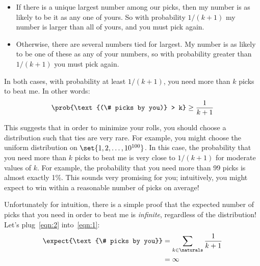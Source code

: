 \begin{editingnotes}
\begin{itemize}
\item If there is a unique largest number among our picks, then my
number is as likely to be it as any one of yours.  So with probability
$1/(k+1)$ my number is larger than all of yours, and you must pick
again.

\item Otherwise, there are several numbers tied for largest.  My
number is as likely to be one of these as any of your numbers, so with
probability greater than $1/(k+1)$ you must pick again.

\end{itemize}
%
In both cases, with probability at least $1/(k+1)$, you need more than
$k$ picks to beat me.  In other words:
%
\begin{align}
\prob{\text{(\# picks by you)} > k} \geq \frac{1}{k+1} \label{eqn:2}
\end{align}

This suggests that in order to minimize your rolls, you should choose a
distribution such that ties are very rare.  For example, you might
choose the uniform distribution on $\set{1, 2, \dots, 10^{100}}$.  In
this case, the probability that you need more than $k$ picks to beat
me is very close to $1/(k+1)$ for moderate values of $k$.  For
example, the probability that you need more than 99 picks is almost
exactly 1\%.  This sounds very promising for you; intuitively, you
might expect to win within a reasonable number of picks on average!

Unfortunately for intuition, there is a simple proof that the expected
number of picks that you need in order to beat me is
\emph{infinite}, regardless of the distribution!  Let's
plug~\eqref{eqn:2} into~\eqref{eqn:1}:
%
\begin{align*}
\expect{\text{\# picks by you}}
    & = \sum_{k \in \naturals} \frac{1}{k+1} \\
    & = \infty
\end{align*}

\end{editingnotes}

